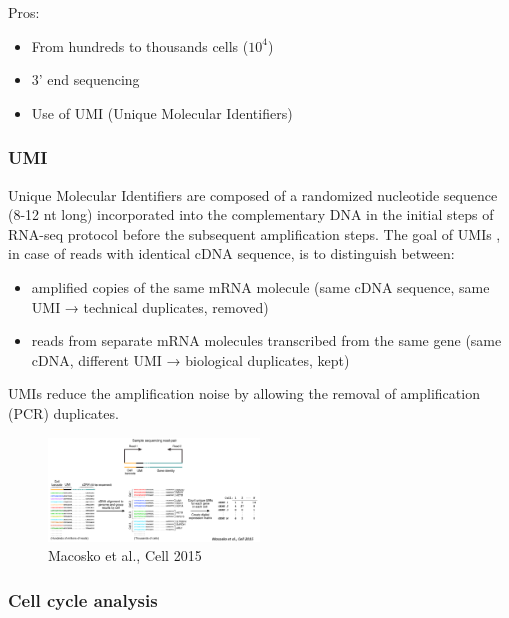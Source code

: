Pros:

\begin{itemize}
\tightlist
\item
  From hundreds to thousands cells ($10^4$)
\item
  3' end sequencing
\item
  Use of UMI (Unique Molecular Identifiers)
\end{itemize}

\hypertarget{umi}{%
\subsubsection{UMI}\label{umi}}

Unique Molecular Identifiers are composed of a randomized nucleotide
sequence (8-12 nt long) incorporated into the complementary DNA in the
initial steps of RNA-seq protocol before the subsequent amplification
steps. The goal of UMIs , in case of reads with identical cDNA sequence,
is to distinguish between:

\begin{itemize}
\tightlist
\item
  amplified copies of the same mRNA molecule (same cDNA sequence, same
  UMI → technical duplicates, removed)
\item
  reads from separate mRNA molecules transcribed from the same gene
  (same cDNA, different UMI → biological duplicates, kept)
\end{itemize}

UMIs reduce the amplification noise by allowing the removal of
amplification (PCR) duplicates.

\begin{figure}
\centering
\includegraphics[width=0.5\textwidth]{images/Screen_Shot_2023-02-21_at_19-54-26.png}
\caption{Macosko et al., Cell 2015}
\end{figure}

\hypertarget{cell-cycle-analysis}{%
\subsubsection{Cell cycle analysis}\label{cell-cycle-analysis}}

